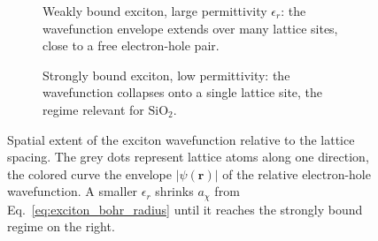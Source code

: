 \begin{figure}[h!]
    \centering
    \begin{subfigure}{0.48\textwidth}
        \centering
        \caption{Weakly bound exciton, large permittivity $\epsilon_r$: the wavefunction envelope extends over many lattice sites, close to a free electron-hole pair.}
    \end{subfigure}
    \hfill
    \begin{subfigure}{0.48\textwidth}
        \centering
        \caption{Strongly bound exciton, low permittivity: the wavefunction collapses onto a single lattice site, the regime relevant for $\mathrm{SiO}_2$.}
    \end{subfigure}
    \caption{Spatial extent of the exciton wavefunction relative to the lattice spacing. The grey dots represent lattice atoms along one direction, the colored curve the envelope $|\psi(\mathbf{r})|$ of the relative electron-hole wavefunction. A smaller $\epsilon_r$ shrinks $a_\chi$ from Eq.~\eqref{eq:exciton_bohr_radius} until it reaches the strongly bound regime on the right.}
    \label{fig:exciton_localization}
\end{figure}
